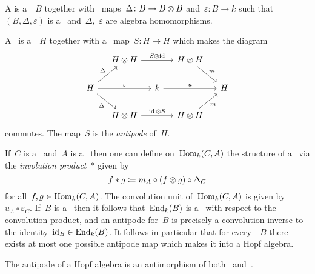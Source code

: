 \begin{definition}
  A \emph{} is a~~$B$ together with~ maps~$\Delta \colon B \to B \mathbin{\otimes} B$ and~$\varepsilon \colon B \to k$ such that~$(B,\Delta,\varepsilon)$ is a~ and~$\Delta$,~$\varepsilon$ are algebra homomorphisms.
\end{definition}


\begin{definition}
  A~ is a~~$H$ together with a~ map~$S \colon H \to H$ which makes the diagram
  \[
    \begin{tikzcd}[column sep = small]
        {}
      & H \tensor H
        \arrow{rr}[above]{S \tensor \id}
      & {}
      & H \tensor H
        \arrow{dr}[above right]{m}
      & {}
      \\
        H
        \arrow{ur}[above left]{\Delta}
        \arrow{rr}[above]{\varepsilon}
        \arrow{dr}[below left]{\Delta}
      & {}
      & k
        \arrow{rr}[above]{u}
      & {}
      & H
      \\
        {}
      & H \tensor H
        \arrow{rr}[above]{\id \tensor S}
      & {}
      & H \tensor H
        \arrow{ur}[below right]{m}
      & {}
    \end{tikzcd}
  \]
  commutes.
  The map~$S$ is the \emph{antipode} of~$H$.
\end{definition}


\begin{remark}
  If~$C$ is a~ and~$A$ is a~ then one can define on~$\operatorname{Hom}_k(C,A)$ the structure of a~ via the \emph{involution product}~$*$ given by
  \[
              f * g
    \coloneqq  m_A \circ (f \mathbin{\otimes} g) \circ \Delta_C
  \]
  for all~$f, g \in \operatorname{Hom}_k(C,A)$.
  The convolution unit of~$\operatorname{Hom}_k(C,A)$ is given by~$u_A \circ \varepsilon_C$.
  If~$B$ is a~ then it follows that~$\operatorname{End}_k(B)$ is a~ with respect to the convolution product, and an antipode for~$B$ is precisely a convolution inverse to the identity~$\operatorname{id}_B \in \operatorname{End}_k(B)$.
  It follows in particular that for every~~$B$ there exists at most one possible antipode map which makes it into a Hopf algebra.
  
  The antipode of a Hopf algebra is an antimorphism of both~ and~.
\end{remark}


